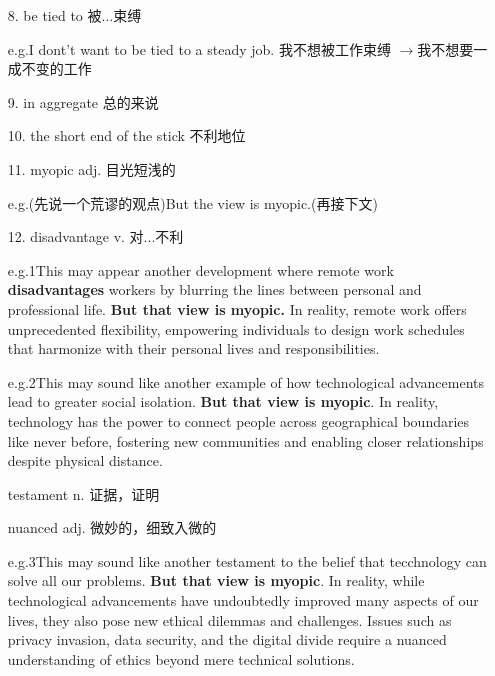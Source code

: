 \begin{itemize}
    \item [8.]be tied to 被...束缚
    
    e.g.\qquad I dont't want to be tied to a steady job. 我不想被工作束缚
    $\rightarrow$我不想要一成不变的工作
    \item [9.]in aggregate 总的来说
    \item [10.]the short end of the stick 不利地位
    \item [11.]myopic adj. 目光短浅的
    
    e.g.\qquad (先说一个荒谬的观点)But the 
    view is myopic.(再接下文)
    \item [12.]disadvantage v. 对...不利
    
    e.g.1\qquad This may appear another development 
    where remote work \textbf{disadvantages }workers 
    by blurring the lines between personal and 
    professional life. \textbf{But that view is 
    myopic.} In reality, remote work offers 
    unprecedented flexibility, empowering individuals 
    to design work schedules that harmonize with 
    their personal lives and responsibilities.

    e.g.2\qquad This may sound like another example 
    of how technological advancements lead to greater 
    social isolation. \textbf{But that view is myopic}. 
    In reality, technology has the power to connect 
    people across geographical boundaries like 
    never before, fostering new communities and enabling 
    closer relationships despite physical distance.

    testament n. 证据，证明

    nuanced adj. 微妙的，细致入微的

    e.g.3\qquad This may sound like another testament
    to the belief that tecchnology can solve all our 
    problems. \textbf{But that view is myopic}. 
    In reality, while technological advancements 
    have undoubtedly improved many aspects of our 
    lives, they also pose new ethical dilemmas and 
    challenges. Issues such as privacy invasion, 
    data security, and the digital divide require a 
    nuanced understanding of ethics beyond mere 
    technical solutions.
\end{itemize}